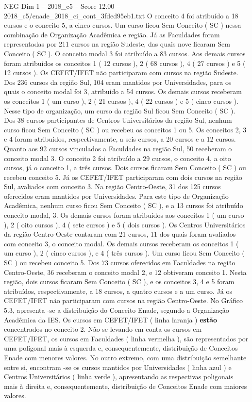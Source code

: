 \begin{textsample}{NEG Dim 1 – 2018\_c5 – Score 12.00 – 2018\_c5/enade\_2018\_ci\_cont\_3fded95eb1.txt}
O conceito 4 foi atribuído a 18 cursos e o conceito 5, a cinco cursos.
Um curso ficou Sem Conceito ( SC ) nessa combinação de Organização Acadêmica e região.
Já as Faculdades foram representadas por 211 cursos na região Sudeste, das quais nove ficaram Sem Conceito ( SC ).
O conceito modal 3 foi atribuído a 83 cursos.
Aos demais cursos foram atribuídos os conceitos 1 ( 12 cursos ), 2 ( 68 cursos ), 4 ( 27 cursos ) e 5 ( 12 cursos ).
Os CEFET/IFET não participaram com cursos na região Sudeste.
Dos 236 cursos da região Sul, 104 eram mantidos por Universidades, para os quais o conceito modal foi 3, atribuído a 54 cursos.
Os demais cursos receberam os conceitos 1 ( um curso ), 2 ( 21 cursos ), 4 ( 22 cursos ) e 5 ( cinco cursos ).
Nesse tipo de organização, um curso da região Sul ficou Sem Conceito ( SC ).
Dos 38 cursos participantes de Centros Universitários da região Sul, nenhum curso ficou Sem Conceito ( SC ) ou recebeu os conceitos 1 ou 5.
Os conceitos 2, 3 e 4 foram atribuídos, respectivamente, a seis cursos, a 20 cursos e a 12 cursos.
Quanto aos 92 cursos vinculados a Faculdades na região Sul, 50 receberam o conceito modal 3.
O conceito 2 foi atribuído a 29 cursos, o conceito 4, a oito cursos, já o conceito 1, a três cursos.
Dois cursos ficaram Sem Conceito ( SC ) ou recebeu conceito 5.
Já os CEFET/IFET participaram com dois cursos na região Sul, avaliados com conceito 3.
Na região Centro-Oeste, 31 dos 125 cursos oferecidos eram mantidos por Universidades.
Para este tipo de Organização Acadêmica, nenhum curso ficou Sem Conceito ( SC ), e a 13 cursos foi atribuído conceito modal, 3.
Os demais cursos foram atribuídos aos conceitos 1 ( um curso ), 2 ( oito cursos ), 4 ( sete cursos ) e 5 ( dois cursos ).
Os Centros Universitários da região Centro-Oeste contaram com 21 cursos, 11 dos quais foram avaliados com conceito 3, o conceito modal.
Os demais cursos receberam os conceitos 1 ( um curso ), 2 ( cinco cursos ), e 4 ( três cursos ).
Um curso ficou Sem Conceito ( SC ) ou recebeu conceito 5.
Dos 73 cursos oferecidos em Faculdades na região Centro-Oeste, 36 receberam o conceito modal 2, e 12 obtiveram conceito 1.
Nesta região, dois cursos ficaram Sem Conceito ( SC ), e os conceitos 3, 4 e 5 foram atribuídos, respectivamente, a 18 cursos, a quatro cursos e a um curso.
Já os CEFET/IFET não participaram com cursos na região Centro-Oeste.
No Gráfico 5.3, apresenta -se a distribuição do Conceito Enade, segundo a Organização Acadêmica da IES.
Os cursos em CEFET/IFET ( linha laranja ) \textbf{estão} concentrados no conceito 2.
Não se levando em conta os cursos em CEFET/IFET, os cursos em Faculdades ( linha vermelha ), são representados por uma poligonal mais à esquerda e, consequentemente, distribuição de Conceitos Enade com menores valores.
No outro extremo, com uma distribuição semelhante entre si, encontram -se os cursos mantidos por Universidades ( linha azul ) e Centros Universitários ( linha verde ), apresentando as respectivas poligonais mais à direita e, consequentemente, distribuição de Conceitos Enade com maiores valores.

\end{textsample}
